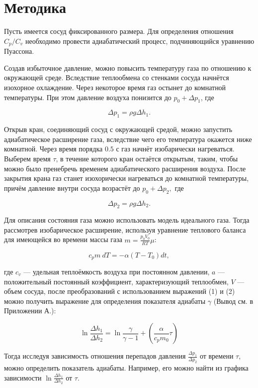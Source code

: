 \chapter{Методика}
\label{ch:methods}

Пусть имеется сосуд фиксированного размера. Для определения отношения $C_p/C_v$ необходимо провести адиабатический процесс, подчиняющийся уравнению Пуассона.

Создав избыточное давление, можно повысить температуру газа по отношению к окружающей среде. Вследствие теплообмена со стенками сосуда начнётся изохорное охлаждение. Через некоторое время газ остынет до комнатной температуры. При этом давление воздуха понизится до $p_0 + \Delta p_1$, где

\begin{equation}
    \Delta p_1 = \rho g \Delta h_1.
\end{equation}

Открыв кран, соединяющий сосуд с окружающей средой, можно запустить адиабатическое расширение газа, вследствие чего его температура окажется ниже комнатной. Через время порядка $0.5$ с газ начнёт изобарически нагреваться. Выберем время $\tau$, в течение которого кран остаётся открытым, таким, чтобы можно было пренебречь временем адиабатического расширения воздуха. После закрытия крана газ станет изохорически нагреваться до комнатной температуры, причём давление внутри сосуда возрастёт до $p_0 + \Delta p_2,$ где

\begin{equation}
    \Delta p_2 = \rho g \Delta h_2.
\end{equation}

Для описания состояния газа можно использовать модель идеального газа. Тогда рассмотрев изобарическое расширение, используя уравнение теплового баланса для имеющейся во времени массы газа $m = \frac{p_0V_0}{RT}\mu$:

\begin{equation}
    c_p m \ dT = -\alpha (T - T_0) dt, 
\end{equation}

где $c_v$ — удельная теплоёмкость воздуха при постоянном давлении, $a$ — положительный постоянный коэффициент, характеризующий теплообмен, $V$ — объем сосуда, после преобразований с использованием выражений (1) и (2) можно получить выражение для определения показателя адиабаты $\gamma$ (Вывод см. в Приложении А.):

\begin{equation}
    \ln{\frac{\Delta h_1}{\Delta h_2}} = \ln{\frac{\gamma}{\gamma - 1}} + \left( \frac{\alpha}{c_p m_0}  \tau\right) 
\end{equation}

Тогда исследуя зависимость отношения перепадов давления $\frac{\Delta p_1}{\Delta p_2}$ от времени $\tau$, можно определить показатель адиабаты. Например, его можно найти из графика зависимости $\ln{\frac{\Delta h_1}{\Delta h_2}}$ от $\tau$.


